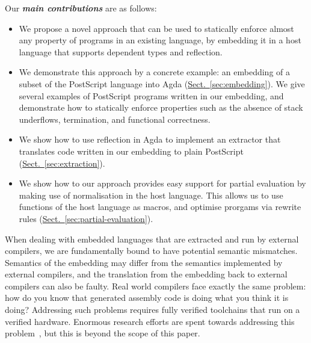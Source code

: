 \documentclass[sigplan,screen]{acmart}
\newcommand{\myref}[2]{\hyperref[#2]{#1~\ref*{#2}}}
\newcommand{\secref}[1]{\myref{Sect.}{sec:#1}}
\begin{document}


Our \textit{\textbf{main contributions}} are as follows:

\begin{itemize}

\item We propose a novel approach that can be used to statically
  enforce almost any property of programs in an existing language, by
  embedding it in a host language that supports dependent types and
  reflection.

\item We demonstrate this approach by a concrete example: an embedding
  of a subset of the PostScript language into Agda
  (\secref{embedding}). We give several examples of PostScript
  programs written in our embedding, and demonstrate how to statically
  enforce properties such as the absence of stack underflows,
  termination, and functional correctness.

\item We show how to use reflection in Agda to implement an extractor
  that translates code written in our embedding to plain PostScript
  (\secref{extraction}).

\item We show how to our approach provides easy support for partial
  evaluation by making use of normalisation in the host language. This
  allows us to use functions of the host language as macros,
  and optimise prorgams via rewrite rules (\secref{partial-evaluation}).

\end{itemize}

When dealing with embedded languages that are ex\-trac\-ted and run
by external compilers, we are fundamentally bound to have potential
semantic mismatches.  Semantics of the embedding may differ from the
semantics implemented by external compilers, and the translation from the
embedding back to external compilers can also be faulty.  Real world compilers
face exactly the same problem: how do you know that generated assembly
code is doing what you think it is doing?  Addressing such problems
requires fully verified toolchains that run on a verified hardware.
Enormous research efforts are spent towards addressing this
problem~\cite{Leroy09,KumarMNO14}, but this is beyond the scope of this paper.
\end{document}
